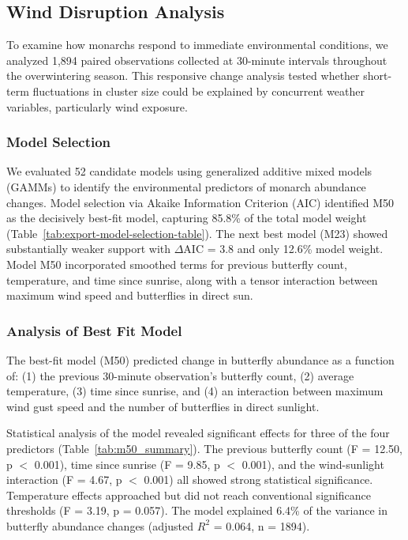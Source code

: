 \subsection{Wind Disruption Analysis}

To examine how monarchs respond to immediate environmental conditions, we analyzed 1,894 paired observations collected at 30-minute intervals throughout the overwintering season. This responsive change analysis tested whether short-term fluctuations in cluster size could be explained by concurrent weather variables, particularly wind exposure.

\subsubsection{Model Selection}

We evaluated 52 candidate models using generalized additive mixed models (GAMMs) to identify the environmental predictors of monarch abundance changes. Model selection via Akaike Information Criterion (AIC) identified M50 as the decisively best-fit model, capturing 85.8\% of the total model weight (Table~\ref{tab:export-model-selection-table}). The next best model (M23) showed substantially weaker support with $\Delta$AIC = 3.8 and only 12.6\% model weight. Model M50 incorporated smoothed terms for previous butterfly count, temperature, and time since sunrise, along with a tensor interaction between maximum wind speed and butterflies in direct sun.

 

\subsubsection{Analysis of Best Fit Model}

The best-fit model (M50) predicted change in butterfly abundance as a function of: (1) the previous 30-minute observation's butterfly count, (2) average temperature, (3) time since sunrise, and (4) an interaction between maximum wind gust speed and the number of butterflies in direct sunlight.

Statistical analysis of the model revealed significant effects for three of the four predictors (Table~\ref{tab:m50_summary}). The previous butterfly count (F = 12.50, p $<$ 0.001), time since sunrise (F = 9.85, p $<$ 0.001), and the wind-sunlight interaction (F = 4.67, p $<$ 0.001) all showed strong statistical significance. Temperature effects approached but did not reach conventional significance thresholds (F = 3.19, p = 0.057). The model explained 6.4\% of the variance in butterfly abundance changes (adjusted $R^2$ = 0.064, n = 1894).

